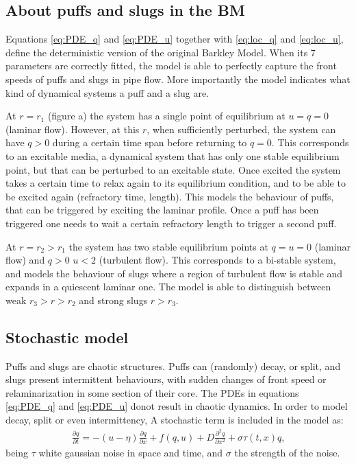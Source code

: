 \documentclass{article}
\begin{document}
\subsection{About puffs and slugs in the BM}
Equations \ref{eq:PDE_q} and \ref{eq:PDE_u} together with \ref{eq:loc_q} and \ref{eq:loc_u}, define the deterministic version of the original Barkley Model. When its 7 parameters are correctly fitted, the model is able to perfectly capture the front speeds of puffs and slugs in pipe flow. More importantly the model indicates what kind of dynamical systems a puff and a slug are.

At $r=r_{1}$ (figure a) the system has a single point of equilibrium at $u=q=0$ (laminar flow). However, at this $r$, when sufficiently perturbed, the system can have $q>0$ during a certain time span before returning to $q=0$. This corresponds to an excitable media, a dynamical system that has only one stable equilibrium point, but that can be perturbed to an excitable state. Once excited the system takes a certain time to relax again to its equilibrium condition, and to be able to be excited again (refractory time, length). This models the behaviour of puffs, that can be triggered by exciting the laminar profile. Once a puff has been triggered one needs to wait a certain refractory length to trigger a second puff. 

At $r=r_{2}>r_{1}$ the system has two stable equilibrium points at $q=u=0$ (laminar flow) and $q>0$ $u<2$ (turbulent flow). This corresponds to a bi-stable system, and models the behaviour of slugs where a region of turbulent flow is stable and expands in a quiescent laminar one. The model is able to distinguish between weak $r_{3}>r>r_{2}$ and strong slugs $r>r_{3}$. 





\subsection{Stochastic model}
Puffs and slugs are chaotic structures. Puffs can (randomly) decay, or split, and slugs present intermittent behaviours, with sudden changes of front speed or relaminarization in some section of their core. The PDEs in equations \ref{eq:PDE_q} and \ref{eq:PDE_u} donot result in chaotic dynamics. In order to model decay, split or even intermittency, A stochastic term is included in the model as:
\begin{align}
\frac{\partial q}{\partial t}=-\left(u-\eta \right)\frac{\partial q}{\partial x} + f\left(q,u \right) + D\frac{\partial^{2} q}{\partial x^{2}} + \sigma \tau \left(t,x\right) q \text{,}
\label{eq:SPDE_q}
\end{align}
being $\tau$ white gaussian noise in space and time, and $\sigma$ the strength of the noise. 
\end{document}
